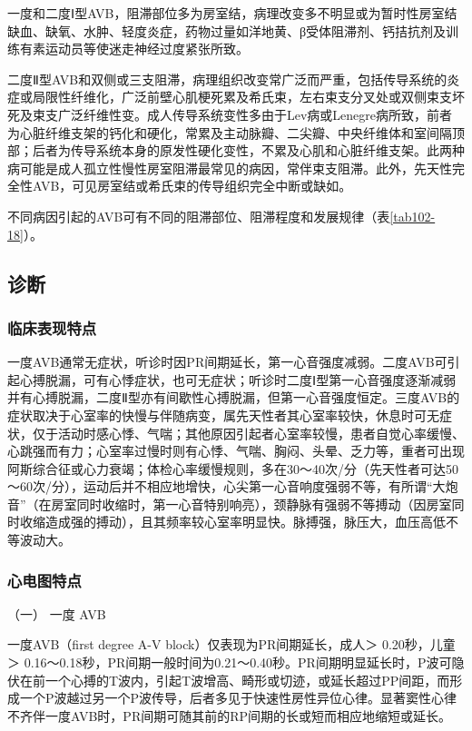 一度和二度Ⅰ型AVB，阻滞部位多为房室结，病理改变多不明显或为暂时性房室结缺血、缺氧、水肿、轻度炎症，药物过量如洋地黄、β受体阻滞剂、钙拮抗剂及训练有素运动员等使迷走神经过度紧张所致。

二度Ⅱ型AVB和双侧或三支阻滞，病理组织改变常广泛而严重，包括传导系统的炎症或局限性纤维化，广泛前壁心肌梗死累及希氏束，左右束支分叉处或双侧束支坏死及束支广泛纤维性变。成人传导系统变性多由于Lev病或Lenegre病所致，前者为心脏纤维支架的钙化和硬化，常累及主动脉瓣、二尖瓣、中央纤维体和室间隔顶部；后者为传导系统本身的原发性硬化变性，不累及心肌和心脏纤维支架。此两种病可能是成人孤立性慢性房室阻滞最常见的病因，常伴束支阻滞。此外，先天性完全性AVB，可见房室结或希氏束的传导组织完全中断或缺如。

不同病因引起的AVB可有不同的阻滞部位、阻滞程度和发展规律（表\ref{tab102-18}）。

\subsection{诊断}

\subsubsection{临床表现特点}

一度AVB通常无症状，听诊时因PR间期延长，第一心音强度减弱。二度AVB可引起心搏脱漏，可有心悸症状，也可无症状；听诊时二度Ⅰ型第一心音强度逐渐减弱并有心搏脱漏，二度Ⅱ型亦有间歇性心搏脱漏，但第一心音强度恒定。三度AVB的症状取决于心室率的快慢与伴随病变，属先天性者其心室率较快，休息时可无症状，仅于活动时感心悸、气喘；其他原因引起者心室率较慢，患者自觉心率缓慢、心跳强而有力；心室率过慢时则有心悸、气喘、胸闷、头晕、乏力等，重者可出现阿斯综合征或心力衰竭；体检心率缓慢规则，多在30～40次/分（先天性者可达50～60次/分），运动后并不相应地增快，心尖第一心音响度强弱不等，有所谓“大炮音”（在房室同时收缩时，第一心音特别响亮），颈静脉有强弱不等搏动（因房室同时收缩造成强的搏动），且其频率较心室率明显快。脉搏强，脉压大，血压高低不等波动大。

\subsubsection{心电图特点}

\hypertarget{text00297.htmlux5cux23CHP10-2-10-2-2-1}{}
（一） 一度 AVB

一度AVB（first degree A-V block）仅表现为PR间期延长，成人＞
0.20秒，儿童＞
0.16～0.18秒，PR间期一般时间为0.21～0.40秒。PR间期明显延长时，P波可隐伏在前一个心搏的T波内，引起T波增高、畸形或切迹，或延长超过PP间距，而形成一个P波越过另一个P波传导，后者多见于快速性房性异位心律。显著窦性心律不齐伴一度AVB时，PR间期可随其前的RP间期的长或短而相应地缩短或延长。

